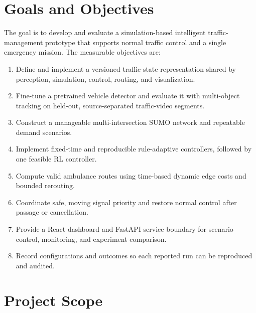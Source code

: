 \section{Goals and Objectives}

The goal is to develop and evaluate a simulation-based intelligent traffic-management prototype that supports normal traffic control and a single emergency mission. The measurable objectives are:

\begin{enumerate}[label=O\arabic*.]
\item Define and implement a versioned traffic-state representation shared by perception, simulation, control, routing, and visualization.
\item Fine-tune a pretrained vehicle detector and evaluate it with multi-object tracking on held-out, source-separated traffic-video segments.
\item Construct a manageable multi-intersection SUMO network and repeatable demand scenarios.
\item Implement fixed-time and reproducible rule-adaptive controllers, followed by one feasible RL controller.
\item Compute valid ambulance routes using time-based dynamic edge costs and bounded rerouting.
\item Coordinate safe, moving signal priority and restore normal control after passage or cancellation.
\item Provide a React dashboard and FastAPI service boundary for scenario control, monitoring, and experiment comparison.
\item Record configurations and outcomes so each reported run can be reproduced and audited.
\end{enumerate}

\section{Project Scope}

